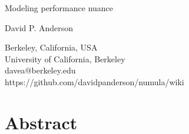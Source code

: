 \documentclass[letterpaper, 12pt]{article}
\begin{document}
{\cmjTitle Modeling performance nuance}
\vspace*{24pt}

{\cmjAuthor David P. Anderson}
\begin{cmjAuthorAddress}
  Berkeley, California, USA   \\
  University of California, Berkeley \\
  davea@berkeley.edu \\
  https://github.com/davidpanderson/numula/wiki
\end{cmjAuthorAddress}

\section{Abstract}
\end{document}
